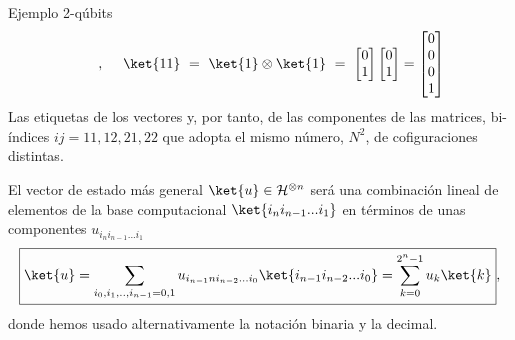 \documentclass[a4paper,11pt]{book} %
\numberwithin{equation}{chapter}
\begin{document}
\begin{mybox_green}{Ejemplo 2-qúbits}
$$ ~~~~~,~~~~
\ket{11}~=~ \ket{1}\otimes \ket{1}~=~
\begin{bmatrix}0\\ 1\end{bmatrix}\begin{bmatrix}0\\ 1\end{bmatrix} = \begin{bmatrix}0\\0\\0 \\ 1\end{bmatrix}
$$
	Las etiquetas de los vectores y, por tanto, de las componentes de las matrices, bi-índices $ij=11,12,21,22$ 
	que adopta el mismo número, $N^2$, de cofiguraciones distintas. 
	\end{mybox_green}


El vector de estado más general  $\ket{u}\in \mathcal{H}^{\otimes n}$ será una combinación lineal de elementos de la base computacional $\ket{i_n i_{n-1}...i_1}$ en términos de unas componentes $u_{i_ni_{n-1}...i_1}$
	\begin{equation} \label{ec_multiqubit_u_general}
	\boxed{\ket{u} = \sum_{i_0,i_1,..,i_{n-1}=0,1} u_{i_{n-1}ni_{n-2}...i_0} \ket{i_{n-1} i_{n-2}...i_0}  = \sum_{k=0}^{2^n-1} u_k \ket{k}},
	\end{equation}
donde hemos usado alternativamente la notación binaria y la decimal. 
\end{document}
